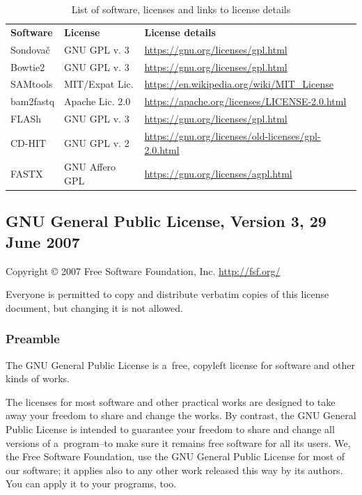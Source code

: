 \documentclass[a4paper, 11pt, twoside]{article}
\begin{document}
\begin{table}[htb]
\caption[List of software and licenses]{List of software, licenses and links to license details}
\begin{tabular}{lll}
\textbf{Software} & \textbf{License} & \textbf{License details}\\
Sondovač & GNU GPL v. 3 & \url{https://gnu.org/licenses/gpl.html}\\
Bowtie2 & GNU GPL v. 3 & \url{https://gnu.org/licenses/gpl.html}\\
SAMtools & MIT/Expat Lic. & \url{https://en.wikipedia.org/wiki/MIT_License}\\
bam2fastq & Apache Lic. 2.0 & \url{https://apache.org/licenses/LICENSE-2.0.html}\\
FLASh & GNU GPL v. 3 & \url{https://gnu.org/licenses/gpl.html}\\
CD-HIT & GNU GPL v. 2 & \url{https://gnu.org/licenses/old-licenses/gpl-2.0.html}\\
FASTX & GNU Affero GPL & \url{https://gnu.org/licenses/agpl.html}
\end{tabular}
\label{software-lic}
\end{table}

\begingroup
\fontsize{7pt}{8pt}
\selectfont

\subsection{GNU General Public License, Version 3, 29 June 2007}

Copyright © 2007 Free Software Foundation, Inc. \url{http://fsf.org/}

Everyone is permitted to copy and distribute verbatim copies of this license document, but changing it is not allowed.

\subsubsection{Preamble}

The GNU General Public License is a~free, copyleft license for software and other kinds of works.

The licenses for most software and other practical works are designed to take away your freedom to share and change the works. By contrast, the GNU General Public License is intended to guarantee your freedom to share and change all versions of a~program--to make sure it remains free software for all its users. We, the Free Software Foundation, use the GNU General Public License for most of our software; it applies also to any other work released this way by its authors. You can apply it to your programs, too.
\end{document}
